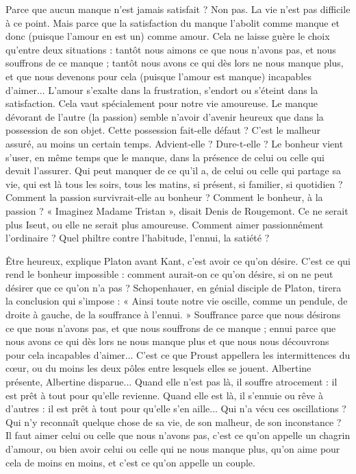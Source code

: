 Parce que aucun manque n’est jamais satisfait ? Non pas. La vie n’est pas
difficile à ce point. Mais parce que la satisfaction du manque l’abolit comme
manque et donc (puisque l'amour en est un) comme amour. Cela ne laisse
guère le choix qu'entre deux situations : tantôt nous aimons ce que nous
n'avons pas, et nous souffrons de ce manque ; tantôt nous avons ce qui dès lors
ne nous manque plus, et que nous devenons pour cela (puisque l’amour est
manque) incapables d’aimer... L'amour s’exalte dans la frustration, s’endort ou
s'éteint dans la satisfaction. Cela vaut spécialement pour notre vie amoureuse.
Le manque dévorant de l’autre (la passion) semble n’avoir d’avenir heureux que
dans la possession de son objet. Cette possession fait-elle défaut ? C’est le malheur
assuré, au moins un certain temps. Advient-elle ? Dure-t-elle ? Le bonheur
vient s’user, en même temps que le manque, dans la présence de celui ou celle
qui devait l’assurer. Qui peut manquer de ce qu’il a, de celui ou celle qui partage
sa vie, qui est là tous les soirs, tous les matins, si présent, si familier, si
quotidien ? Comment la passion survivrait-elle au bonheur ? Comment le bonheur,
à la passion ? « Imaginez Madame Tristan », disait Denis de Rougemont.
Ce ne serait plus Iseut, ou elle ne serait plus amoureuse. Comment aimer passionnément
l'ordinaire ? Quel philtre contre l’habitude, l'ennui, la satiété ?

Être heureux, explique Platon avant Kant, c’est avoir ce qu’on désire. C’est
ce qui rend le bonheur impossible : comment aurait-on ce qu’on désire, si on
ne peut désirer que ce qu’on n’a pas ? Schopenhauer, en génial disciple de
Platon, tirera la conclusion qui s'impose : « Ainsi toute notre vie oscille,
comme un pendule, de droite à gauche, de la souffrance à l'ennui. » Souffrance
parce que nous désirons ce que nous n’avons pas, et que nous souffrons de ce
manque ; ennui parce que nous avons ce qui dès lors ne nous manque plus et
que nous nous découvrons pour cela incapables d'aimer... C’est ce que Proust
appellera les intermittences du cœur, ou du moins les deux pôles entre lesquels
elles se jouent. Albertine présente, Albertine disparue... Quand elle n’est pas là,
il souffre atrocement : il est prêt à tout pour qu’elle revienne. Quand elle est là,
il s'ennuie ou rêve à d’autres : il est prêt à tout pour qu’elle s’en aille... Qui n'a
vécu ces oscillations ? Qui n’y reconnaît quelque chose de sa vie, de son malheur,
de son inconstance ? Il faut aimer celui ou celle que nous n'avons pas,
c’est ce qu’on appelle un chagrin d’amour, ou bien avoir celui ou celle qui ne
nous manque plus, qu’on aime pour cela de moins en moins, et c’est ce qu'on
appelle un couple.

